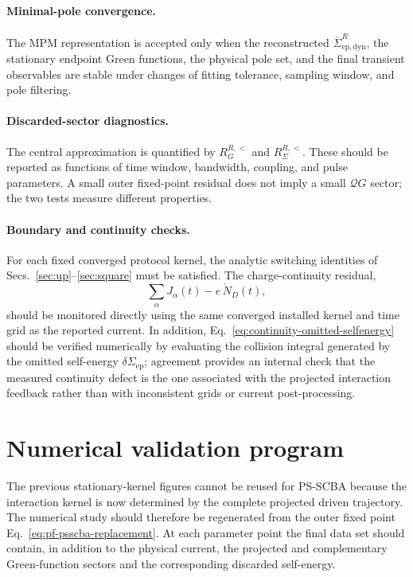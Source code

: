 \documentclass[
 reprint,
 superscriptaddress,
 amsmath,amssymb,
 aps,prb,
 longbibliography,
 floatfix
]{revtex4-2}
\newcommand{\ep}{\mathrm{ep}}
\newcommand{\barSigma}{\overline{\Sigma}}
\newcommand{\qproj}{\mathcal Q}
\begin{document}
\paragraph{Minimal-pole convergence.}
The MPM representation is accepted only when the reconstructed \(\barSigma_{\ep,\mathrm{dyn}}^R\), the stationary endpoint Green functions, the physical pole set, and the final transient observables are stable under changes of fitting tolerance, sampling window, and pole filtering.

\paragraph{Discarded-sector diagnostics.}
The central approximation is quantified by \(R_G^{R,<}\) and \(R_\Sigma^{R,<}\). These should be reported as functions of time window, bandwidth, coupling, and pulse parameters. A small outer fixed-point residual does not imply a small \(\qproj G\) sector; the two tests measure different properties.

\paragraph{Boundary and continuity checks.}
For each fixed converged protocol kernel, the analytic switching identities of Secs.~\ref{sec:up}--\ref{sec:square} must be satisfied. The charge-continuity residual,
\begin{equation*}
\sum_\alpha J_\alpha(t)-e\,\dot N_D(t),
\end{equation*}
should be monitored directly using the same converged installed kernel and time grid as the reported current. In addition, Eq.~\eqref{eq:continuity-omitted-selfenergy} should be verified numerically by evaluating the collision integral generated by the omitted self-energy \(\delta\Sigma_{\ep}\); agreement provides an internal check that the measured continuity defect is the one associated with the projected interaction feedback rather than with inconsistent grids or current post-processing.



\section{Numerical validation program}
\label{sec:results}

The previous stationary-kernel figures cannot be reused for PS-SCBA because the interaction kernel is now determined by the complete projected driven trajectory. The numerical study should therefore be regenerated from the outer fixed point Eq.~\eqref{eq:pf-psscba-replacement}. At each parameter point the final data set should contain, in addition to the physical current, the projected and complementary Green-function sectors and the corresponding discarded self-energy.
\end{document}
